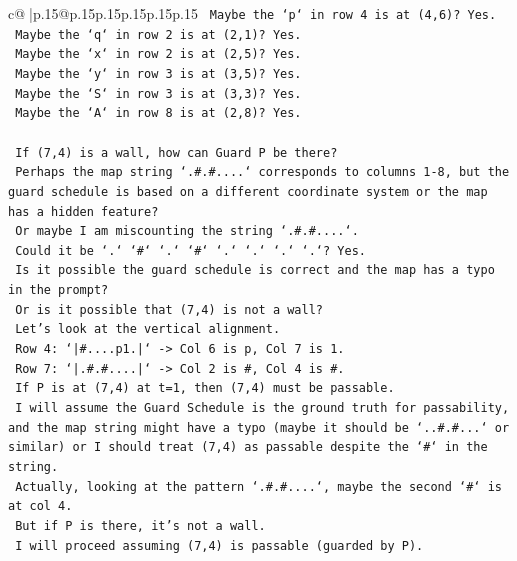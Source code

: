\documentclass{article}
\begin{document}
{\begin{supertabular}{c@{$\;$}|p{.15\linewidth}@{}p{.15\linewidth}p{.15\linewidth}p{.15\linewidth}p{.15\linewidth}p{.15\linewidth}}
{{{\texttt{              Maybe the `p` in row 4 is at (4,6)? Yes.} \\
\texttt{              Maybe the `q` in row 2 is at (2,1)? Yes.} \\
\texttt{              Maybe the `x` in row 2 is at (2,5)? Yes.} \\
\texttt{              Maybe the `y` in row 3 is at (3,5)? Yes.} \\
\texttt{              Maybe the `S` in row 3 is at (3,3)? Yes.} \\
\texttt{              Maybe the `A` in row 8 is at (2,8)? Yes.} \\
\\ 
\texttt{              If (7,4) is a wall, how can Guard P be there?} \\
\texttt{              Perhaps the map string `.\#.\#....` corresponds to columns 1{-}8, but the guard schedule is based on a different coordinate system or the map has a hidden feature?} \\
\texttt{              Or maybe I am miscounting the string `.\#.\#....`.} \\
\texttt{              Could it be `.` `\#` `.` `\#` `.` `.` `.` `.`? Yes.} \\
\texttt{              Is it possible the guard schedule is correct and the map has a typo in the prompt?} \\
\texttt{              Or is it possible that (7,4) is not a wall?} \\
\texttt{              Let's look at the vertical alignment.} \\
\texttt{              Row 4: `|\#....p1.|` {-}> Col 6 is p, Col 7 is 1.} \\
\texttt{              Row 7: `|.\#.\#....|` {-}> Col 2 is \#, Col 4 is \#.} \\
\texttt{              If P is at (7,4) at t=1, then (7,4) must be passable.} \\
\texttt{              I will assume the Guard Schedule is the ground truth for passability, and the map string might have a typo (maybe it should be `..\#.\#...` or similar) or I should treat (7,4) as passable despite the `\#` in the string.} \\
\texttt{              Actually, looking at the pattern `.\#.\#....`, maybe the second `\#` is at col 4.} \\
\texttt{              But if P is there, it's not a wall.} \\
\texttt{              I will proceed assuming (7,4) is passable (guarded by P).} \\
}}}
\end{supertabular}}
\end{document}
